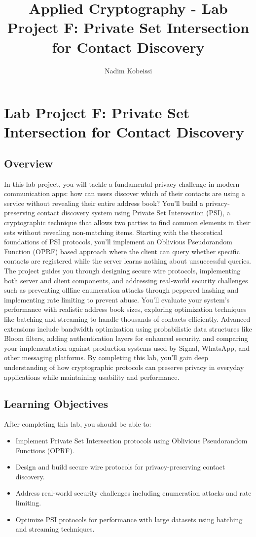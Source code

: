 \documentclass[10pt,a4paper,american]{exam}
\title{Applied Cryptography - Lab Project F: Private Set Intersection for Contact Discovery}
\author{Nadim Kobeissi}
\begin{document}
\classhandoutheader
\section*{Lab Project F: Private Set Intersection for Contact Discovery}

\subsection*{Overview}
In this lab project, you will tackle a fundamental privacy challenge in modern communication apps: how can users discover which of their contacts are using a service without revealing their entire address book? You'll build a privacy-preserving contact discovery system using Private Set Intersection (PSI), a cryptographic technique that allows two parties to find common elements in their sets without revealing non-matching items. Starting with the theoretical foundations of PSI protocols, you'll implement an Oblivious Pseudorandom Function (OPRF) based approach where the client can query whether specific contacts are registered while the server learns nothing about unsuccessful queries. The project guides you through designing secure wire protocols, implementing both server and client components, and addressing real-world security challenges such as preventing offline enumeration attacks through peppered hashing and implementing rate limiting to prevent abuse. You'll evaluate your system's performance with realistic address book sizes, exploring optimization techniques like batching and streaming to handle thousands of contacts efficiently. Advanced extensions include bandwidth optimization using probabilistic data structures like Bloom filters, adding authentication layers for enhanced security, and comparing your implementation against production systems used by Signal, WhatsApp, and other messaging platforms. By completing this lab, you'll gain deep understanding of how cryptographic protocols can preserve privacy in everyday applications while maintaining usability and performance.

\subsection*{Learning Objectives}
After completing this lab, you should be able to:
\begin{itemize}
	\item Implement Private Set Intersection protocols using Oblivious Pseudorandom Functions (OPRF).
	\item Design and build secure wire protocols for privacy-preserving contact discovery.
	\item Address real-world security challenges including enumeration attacks and rate limiting.
	\item Optimize PSI protocols for performance with large datasets using batching and streaming techniques.
\end{itemize}
\end{document}
